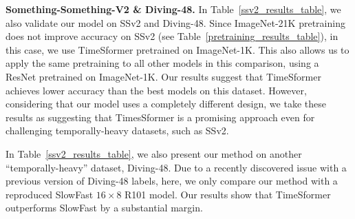 \documentclass{article}
\begin{document}

\textbf{Something-Something-V2 \& Diving-48.} In Table~\ref{ssv2_results_table}, we also validate our model on SSv2 and Diving-48. Since ImageNet-21K pretraining does not improve accuracy on SSv2 (see Table~\ref{pretraining_results_table}), in this case, we use TimeSformer pretrained on ImageNet-1K. This also allows us to apply the same pretraining to all other models in this comparison, using a ResNet pretrained on ImageNet-1K. Our results suggest that TimeSformer achieves lower accuracy than the best models on this dataset. However, considering that our model uses a completely different design, we take these results as suggesting that TimesSformer is a promising approach even for challenging temporally-heavy datasets, such as SSv2. 

In Table~\ref{ssv2_results_table}, we also present our method on another ``temporally-heavy'' dataset, Diving-48. Due to a recently discovered issue with a previous version of Diving-48 labels, here, we only compare our method with a reproduced SlowFast $16\times8$ R101 model. Our results show that TimeSformer outperforms SlowFast by a substantial margin.



\end{document}
